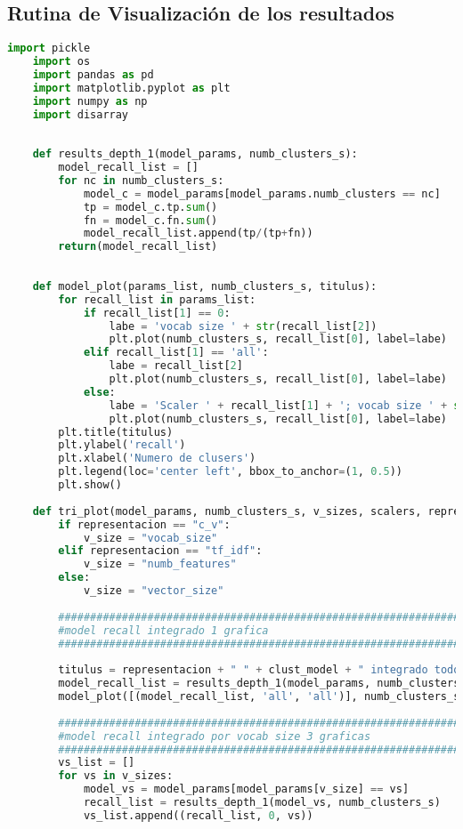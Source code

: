 \documentclass[12pt]{article}
\begin{document}
	\subsection{Rutina de Visualización de los resultados}
	\begin{lstlisting}[language=Python, caption = Rutina de Visualización]
	import pickle
	import os
	import pandas as pd
	import matplotlib.pyplot as plt
	import numpy as np 
	import disarray
	
	
	def results_depth_1(model_params, numb_clusters_s):
	    model_recall_list = []
	    for nc in numb_clusters_s:
	        model_c = model_params[model_params.numb_clusters == nc]
	        tp = model_c.tp.sum()
	        fn = model_c.fn.sum()
	        model_recall_list.append(tp/(tp+fn))
	    return(model_recall_list)
	
	
	def model_plot(params_list, numb_clusters_s, titulus):
	    for recall_list in params_list:
	        if recall_list[1] == 0:
	            labe = 'vocab size ' + str(recall_list[2])
	            plt.plot(numb_clusters_s, recall_list[0], label=labe)
	        elif recall_list[1] == 'all':
	            labe = recall_list[2]
	            plt.plot(numb_clusters_s, recall_list[0], label=labe)            
	        else:
	            labe = 'Scaler ' + recall_list[1] + '; vocab size ' + str(recall_list[2])
	            plt.plot(numb_clusters_s, recall_list[0], label=labe)        
	    plt.title(titulus)
	    plt.ylabel('recall')
	    plt.xlabel('Numero de clusers')
	    plt.legend(loc='center left', bbox_to_anchor=(1, 0.5))
	    plt.show()
	
	def tri_plot(model_params, numb_clusters_s, v_sizes, scalers, representacion, clust_model):
	    if representacion == "c_v":
	        v_size = "vocab_size"
	    elif representacion == "tf_idf":
	        v_size = "numb_features"
	    else:
	        v_size = "vector_size"
	    
	    ##########################################################################
	    #model recall integrado 1 grafica
	    ##########################################################################
	    
	    titulus = representacion + " " + clust_model + " integrado todo"
	    model_recall_list = results_depth_1(model_params, numb_clusters_s)
	    model_plot([(model_recall_list, 'all', 'all')], numb_clusters_s, titulus)
	    
	    ##########################################################################
	    #model recall integrado por vocab size 3 graficas
	    ##########################################################################
	    vs_list = []
	    for vs in v_sizes:
	        model_vs = model_params[model_params[v_size] == vs]
	        recall_list = results_depth_1(model_vs, numb_clusters_s)
	        vs_list.append((recall_list, 0, vs))   
	        

\end{lstlisting}
\end{document}
